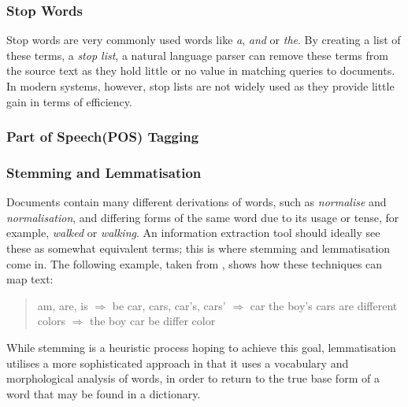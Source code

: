 \subsubsection{Stop Words}
Stop words are very commonly used words like \emph{a}, \emph{and} or \emph{the}. By creating a list of these terms, a \emph{stop list}, a natural language parser can remove these terms from the source text as they hold little or no value in matching queries to documents. In modern systems, however, stop lists are not widely used as they provide little gain in terms of efficiency\cite{manning2008}.

\subsubsection{Part of Speech(POS) Tagging}


\subsubsection{Stemming and Lemmatisation}
Documents contain many different derivations of words, such as \emph{normalise} and \emph{normalisation}, and differing forms of the same word due to its usage or tense, for example, \emph{walked} or \emph{walking}. An information extraction tool should ideally see these as somewhat equivalent terms; this is where stemming and lemmatisation come in. The following example, taken from \cite{manning2008}, shows how these techniques can map text:

\begin{quote}
am, are, is \begin{math}\Rightarrow\end{math} be 
\newline
car, cars, car's, cars' \begin{math}\Rightarrow\end{math} car
\newline
\newline
the boy's cars are different colors  \begin{math}\Rightarrow \end{math}
\newline
the boy car be differ color
\end{quote}

While stemming is a heuristic process hoping to achieve this goal, lemmatisation utilises a more sophisticated approach in that it uses a vocabulary and morphological analysis of words, in order to return to the true base form of a word that may be found in a dictionary.


